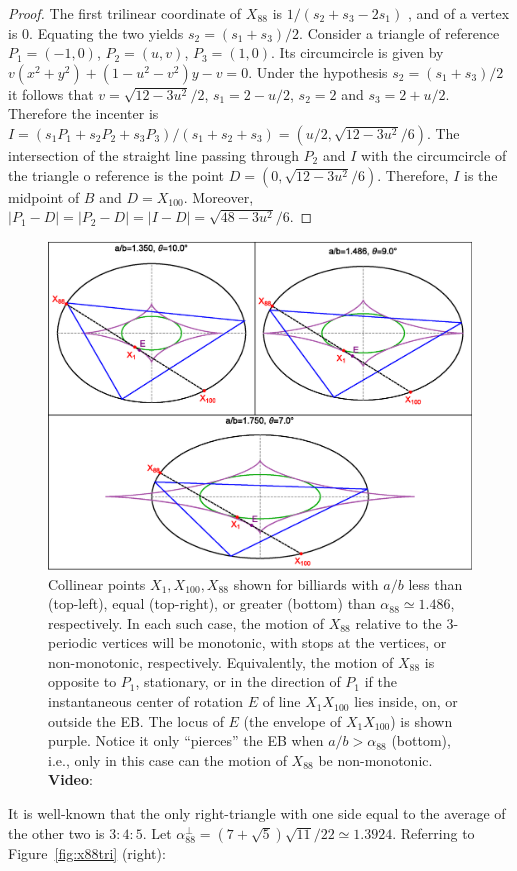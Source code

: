 \begin{proof}
The first trilinear coordinate of $X_{88}$ is $1/(s_2 + s_3 - 2 s_1)$ \cite{etc}, and of a vertex is $0$. Equating the two yields $s_2 = (s_1+s_3)/2$.
Consider a triangle of reference $P_1=(-1,0)$, $P_2=(u,v)$, $P_3=(1,0)$. Its circumcircle is given by  $v(x^2+y^2)+(1-u^2-v^2)y-v=0.$ Under the hypothesis $s_2=(s_1+s_3)/2$ it follows that $v=\sqrt{12-3u^2}/2$, $s_1=2-u/2$, $s_2=2$ and $s_3=2+u/2$.  Therefore the incenter is   $ I= (s_1P_1+s_2P_2+s_3P_3)/(s_1+s_2+s_3)=(u/2, \sqrt{12-3u^2}/6)$. The intersection of the straight line passing through $P_2$ and $I$ with the circumcircle of the triangle o reference is the point $D=(0,\sqrt{12-3u^2}/6).$
Therefore, $I$ is the midpoint of $B$ and $D=X_{100}$. Moreover, $\mid P_1-D\mid=\mid P_2-D\mid=\mid I-D\mid= \sqrt{48-3u^2}/6$.
\end{proof}
%
\begin{figure}
    \centering
    \includegraphics[width=\textwidth]{pics/1120_x88_trio.eps}
    \caption{Collinear points $X_1,X_{100},X_{88}$ shown for billiards with $a/b$ less than (top-left), equal (top-right), or greater (bottom) than $\alpha_{88}{\simeq}1.486$, respectively. In each such case, the motion of $X_{88}$ relative to the 3-periodic vertices will be monotonic, with stops at the vertices, or non-monotonic, respectively. Equivalently, the motion of $X_{88}$ is opposite to $P_1$, stationary, or in the direction of $P_1$ if the instantaneous center of rotation $E$ of line $X_1X_{100}$ lies inside, on, or outside the EB. The locus of $E$ (the envelope of $X_1X_{100}$) is shown purple. Notice it only ``pierces'' the EB when $a/b>\alpha_{88}$ (bottom), i.e., only in this case can the motion of $X_{88}$ be non-monotonic. \textbf{Video}: \cite[PL\#12]{reznik2020-playlist-intriguing}}
    \label{fig:x88-envelope}
\end{figure}
%
It is well-known that the only right-triangle with one side equal to the average of the other two is $3:4:5$. Let $\alpha_{88}^\perp=(7+\sqrt{5})\sqrt{11}/22\simeq{1.3924}.$  Referring to Figure~\ref{fig:x88tri} (right):

